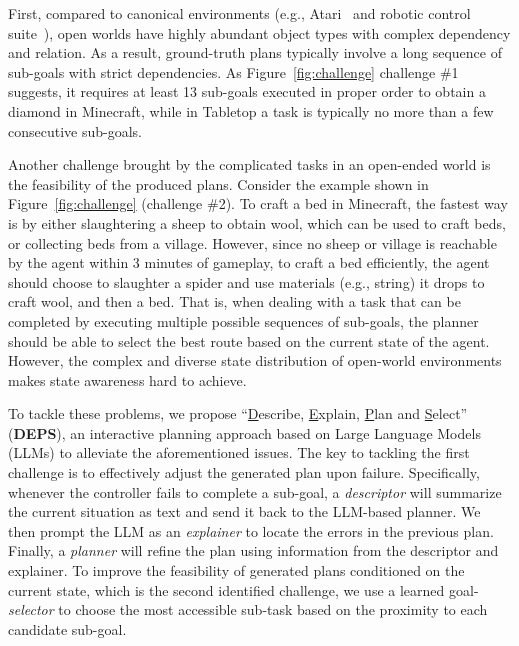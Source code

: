 \documentclass{article}
\begin{document}
First, compared to canonical environments (e.g., Atari~\cite{atari} and robotic control suite~\cite{clipport}), open worlds have highly abundant object types with complex dependency and relation. As a result, ground-truth plans typically involve a long sequence of sub-goals with strict dependencies. As Figure~\ref{fig:challenge} challenge \#1 suggests, it requires at least 13 sub-goals executed in proper order to obtain a diamond in Minecraft, while in Tabletop a task is typically no more than a few consecutive sub-goals.


Another challenge brought by the complicated tasks in an open-ended world is the feasibility of the produced plans. Consider the example shown in Figure~\ref{fig:challenge} (challenge \#2). To craft a bed in Minecraft, the fastest way is by either slaughtering a sheep to obtain wool, which can be used to craft beds, or collecting beds from a village. However, since no sheep or village is reachable by the agent within 3 minutes of gameplay, to craft a bed efficiently, the agent should choose to slaughter a spider and use materials (e.g., string) it drops to craft wool, and then a bed. That is, when dealing with a task that can be completed by executing multiple possible sequences of sub-goals, the planner should be able to select the best route based on the current state of the agent. However, the complex and diverse state distribution of open-world environments makes state awareness hard to achieve.

To tackle these problems, we propose ``\underline{D}escribe, \underline{E}xplain, \underline{P}lan and \underline{S}elect'' (\textbf{DEPS}), an interactive planning approach based on Large Language Models (LLMs) to alleviate the aforementioned issues.
The key to tackling the first challenge is to effectively adjust the generated plan upon failure.
Specifically, whenever the controller fails to complete a sub-goal, a \textit{descriptor} will summarize the current situation as text and send it back to the LLM-based planner. We then prompt the LLM as an \textit{explainer} to locate the errors in the previous plan. 
Finally, a \textit{planner} will refine the plan using information from the descriptor and explainer. 
To improve the feasibility of generated plans conditioned on the current state, which is the second identified challenge, we use a learned goal-\textit{selector} to choose the most accessible sub-task based on the proximity to each candidate sub-goal.
\end{document}
